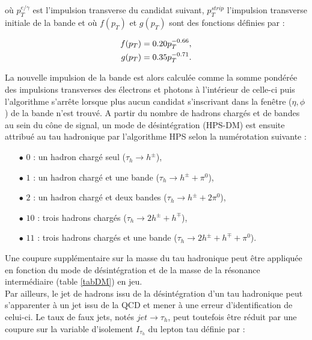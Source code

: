 où $p_T^{e/\gamma}$ est l'impulsion transverse du candidat suivant, $p_T^{strip}$ l'impulsion transverse initiale de la bande et où $f(p_T)$ et $g(p_T)$ sont des fonctions définies par :

\begin{align*}
    f(p_T) & = 0.20 p_T^{-0.66}, \\
    g(p_T) & = 0.35 p_T^{-0.71}.
    \vspace{5pt} 
\end{align*}

La nouvelle impulsion de la bande est alors calculée comme la somme pondérée des impulsions transverses des électrons et photons à l'intérieur de celle-ci puis l'algorithme s'arrête lorsque plus aucun candidat s'inscrivant dans la fenêtre ($\eta,\phi$) de la bande n'est trouvé. A partir du nombre de hadrons chargés et de bandes au sein du cône de signal, un mode de désintégration (HPS-DM) est ensuite attribué au tau hadronique par l'algorithme HPS selon la numérotation suivante :

\begin{itemize}
    \medskip
    \item[$\bullet$] $0$ : un hadron chargé seul ($\tau_h\rightarrow h^{\pm}$),
    \medskip
    \item[$\bullet$] $1$ : un hadron chargé et une bande ($\tau_h\rightarrow h^{\pm}+\pi^0$),
    \medskip
    \item[$\bullet$] $2$ : un hadron chargé et deux bandes ($\tau_h\rightarrow h^{\pm}+2\pi^0$),
    \medskip
    \item[$\bullet$] $10$ : trois hadrons chargés ($\tau_h\rightarrow 2h^{\pm}+h^{\mp}$),
    \medskip
    \item[$\bullet$] $11$ : trois hadrons chargés et une bande ($\tau_h\rightarrow 2h^{\pm}+h^{\mp}+\pi^0$).
    \medskip
\end{itemize}

Une coupure supplémentaire sur la masse du tau hadronique peut être appliquée en fonction du mode de désintégration et de la masse de la résonance intermédiaire (table \ref{tabDM}) en jeu. \\

Par ailleurs, le jet de hadrons issu de la désintégration d'un tau hadronique peut s'apparenter à un jet issu de la QCD et mener à une erreur d'identification de celui-ci. Le taux de faux jets, notés $jet\rightarrow\tau_h$, peut toutefois être réduit par une coupure sur la variable d'isolement $I_{\tau_h}$ du lepton tau définie par :

